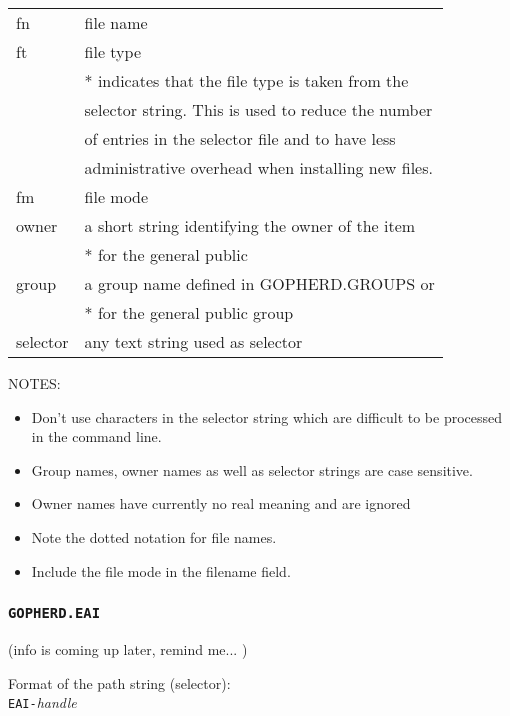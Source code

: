 \noindent\begin{tabular}{|l|l|}\hline
  fn          & file name\\
  ft          & file type\\
              & * indicates that the file type is taken from the\\
              & selector string.  This is used to reduce the number\\
              & of entries in the selector file and to have less\\
              & administrative overhead when installing new files.\\
  fm          & file mode\\
  owner       & a short string identifying the owner of the item\\
              & * for the general public\\
  group       & a group name defined in GOPHERD.GROUPS or\\
              & * for the general public group\\
  selector    & any text string used as selector\\ \hline
\end{tabular}

\rule{0mm}{5mm}
 
\noindent  NOTES:
\begin{itemize}
\item   Don't use characters in the selector string which are difficult
        to be processed in the command line.
\item   Group names, owner names as well as selector strings are case
        sensitive.
\item   Owner names have currently no real meaning and are ignored
\item   Note the dotted notation for file names.
\item   Include the file mode in the filename field.
\end{itemize}
 


\subsubsection{{\tt GOPHERD.EAI}}\label{eaifile}

(info is coming up later, remind me... )

Format of the path string (selector):\\
{\tt EAI-}{\sl handle}

